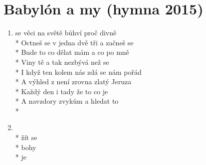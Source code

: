\section{Babylón a my (hymna 2015)}
\begin{enumerate}
\item[] se věci na světě bůhví proč divně \\*
Octneš se v  jedna dvě tři a začneš se \\*
Bude to  co dělat mám a co po mně \\*
Viny tě  a tak nezbývá než se \\*
I když ten  kolem nás zdá se nám pořád \\*
A výhled z  není zrovna zlatý Jeruza\\*
Každý den  i tady že  to co je \,\,\,\\*
A navzdory  zvykům a  hledat to \\*
\item[]   \\*
  žít se \\*
   bohy \\*
  je 
\end{enumerate}
